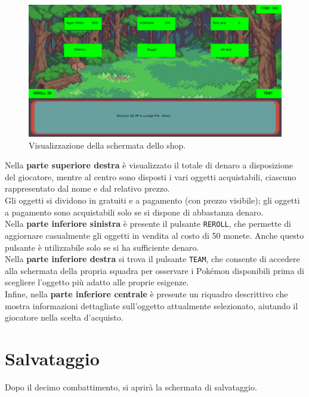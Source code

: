 \documentclass[a4paper,12pt]{report}
\begin{document}
{{\begin{figure}[H]
  \centering
  \includegraphics[width=\textwidth]{immagini/schermataShop.png}
  \caption{Visualizzazione della schermata dello shop.}
  \label{fig:shop_screen}
\end{figure}

Nella \textbf{parte superiore destra} è visualizzato il totale di denaro a disposizione del giocatore, mentre al centro sono disposti i vari oggetti acquistabili, ciascuno rappresentato dal nome e dal relativo prezzo.\\
Gli oggetti si dividono in gratuiti e a pagamento (con prezzo visibile); gli oggetti a pagamento sono acquistabili solo se si dispone di abbastanza denaro.\\
Nella \textbf{parte inferiore sinistra} è presente il pulsante \texttt{REROLL}, che permette di aggiornare casualmente gli oggetti in vendita al costo di 50 monete. Anche questo pulsante è utilizzabile solo se si ha sufficiente denaro.\\
Nella \textbf{parte inferiore destra} si trova il pulsante \texttt{TEAM}, che consente di accedere alla schermata della propria squadra per osservare i Pokémon disponibili prima di scegliere l’oggetto più adatto alle proprie esigenze.\\
Infine, nella \textbf{parte inferiore centrale} è presente un riquadro descrittivo che mostra informazioni dettagliate sull’oggetto attualmente selezionato, aiutando il giocatore nella scelta d’acquisto.


\newpage
\section{Salvataggio}
Dopo il decimo combattimento, si aprirà la schermata di salvataggio.

}}
\end{document}
